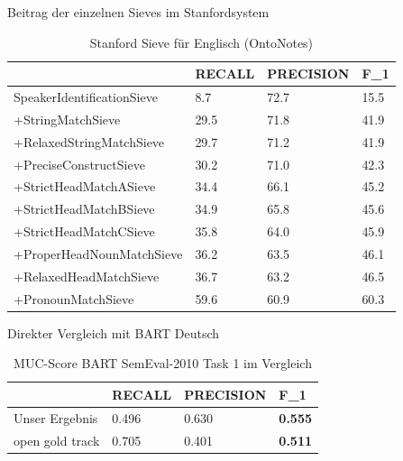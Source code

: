 \documentclass[11pt,a4paper]{beamer}
\begin{document}
\begin{frame}{Beitrag der einzelnen Sieves im Stanfordsystem}
\begin{table}[h]
\begin{tabular}{l||lll}
                           & RECALL & PRECISION & F\_1 \\ \hline
SpeakerIdentificationSieve & 8.7    & 72.7      & 15.5   \\
+StringMatchSieve           & 29.5   & 71.8      & 41.9   \\
+RelaxedStringMatchSieve    & 29.7   & 71.2      & 41.9   \\
+PreciseConstructSieve      & 30.2   & 71.0      & 42.3   \\
+StrictHeadMatchASieve      & 34.4   & 66.1      & 45.2  \\
+StrictHeadMatchBSieve      & 34.9   & 65.8      & 45.6   \\
+StrictHeadMatchCSieve      & 35.8   & 64.0      & 45.9   \\
+ProperHeadNounMatchSieve   & 36.2   & 63.5      & 46.1   \\
+RelaxedHeadMatchSieve      & 36.7   & 63.2      & 46.5   \\
+PronounMatchSieve          & 59.6   & 60.9      & 60.3   \\
                          
\end{tabular}
\caption{Stanford Sieve für Englisch (OntoNotes)}
\end{table}
\end{frame}

\begin{frame}{Direkter Vergleich mit BART Deutsch}
\begin{table}[h]
\begin{tabular}{l||lll}
             	& RECALL		 & PRECISION & F\_1    \\ \hline
Unser Ergebnis 	& 0.496      & 0.630              & \textbf{0.555}  \\
open gold track & 0.705 		 & 0.401     & \textbf{0.511}   
          
\end{tabular}
\caption{MUC-Score BART SemEval-2010 Task 1 im Vergleich} 
\end{table}
\end{frame}
\end{document}
